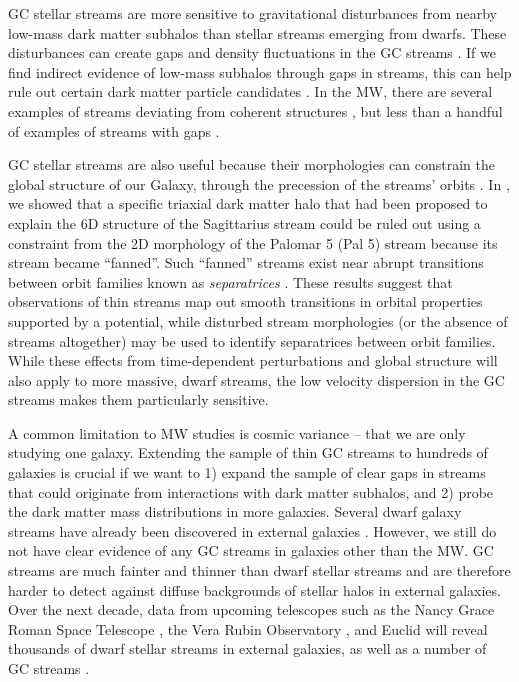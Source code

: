 \documentclass[twocolumn]{aastex631}
\begin{document}
GC stellar streams are more sensitive to gravitational disturbances from nearby low-mass dark matter subhalos than stellar streams emerging from dwarfs. These disturbances can create gaps and density fluctuations in the GC streams \citep[e.g.,][]{yoon11, carlberg12}. 
If we find indirect evidence of low-mass subhalos through gaps in streams, this can help rule out certain dark matter particle candidates \citep[e.g.,][]{bullock17}. 
In the MW, there are several examples of streams deviating from coherent structures \citep[e.g.,][]{bonaca19c,li20,bonaca21b}, but less than a handful of examples of streams with gaps \citep[e.g.,][]{oden01,price18,li20}.


GC stellar streams are also useful because their morphologies can constrain the global structure of our Galaxy, through the precession of the streams' orbits \citep[e.g.,][]{johnston2002,dehnen04,johnston2005,belokurov14,erkal16}. In  \cite{pearson15}, we showed that a specific triaxial dark matter halo that had been proposed to explain the 6D structure of the Sagittarius stream \citep{law10} could be ruled out using a constraint from the 2D morphology of the Palomar 5 (Pal 5) stream because its stream became ``fanned''. Such ``fanned'' streams exist near abrupt transitions between orbit families known as {\it separatrices} \citep{price16,yavetz21}. 
These results suggest that observations of thin streams map out smooth transitions in orbital properties supported by a potential, while disturbed stream morphologies (or the absence of streams altogether) may be used to identify separatrices between orbit families. While these effects from time-dependent perturbations and global structure will also apply to more massive, dwarf streams, the low velocity dispersion in the GC streams makes them particularly sensitive. 


A common limitation to MW studies is cosmic variance -- that we are only studying one galaxy.  Extending the sample of thin GC streams to hundreds of galaxies is crucial if we want to 1) expand the sample of clear gaps in streams that could originate from interactions with dark matter subhalos, and 2) probe the dark matter mass distributions in more galaxies. 
Several dwarf galaxy streams have already been discovered in external galaxies \citep[e.g.,][]{mcconnachie2009,delgado10,denja16}. 
However, we still do not have clear evidence of any GC streams in galaxies other than the MW. GC streams are much fainter and thinner than dwarf stellar streams and are therefore harder to detect against diffuse backgrounds of stellar halos in external galaxies. Over the next decade, data from upcoming telescopes such as the Nancy Grace Roman Space Telescope  \citep[Roman, formerly WFIRST;][]{spergel15}, the Vera Rubin Observatory  \citep[VRO, formerly LSST;][]{laureijs11}, and Euclid \citep[][]{racca16} will reveal thousands of dwarf stellar streams in external galaxies, as well as a number of GC streams \citep{pearson19}. 
\end{document}
